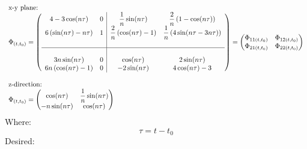 \documentclass[11pt, a4paper]{article}
\begin{document}
\begin{equation}
    \begin{array}{l}
        \text{x-y plane:} \\
        \Phi_{(t,t_0)} = \left(\begin{array}{cc|cc}
            4-3\cos(n\tau) & 0 &\displaystyle \frac{1}{n}\sin(n\tau) &\displaystyle \frac{2}{n}\left(1-\cos(n\tau)\right) \\ 
            6\left(\sin(n\tau)-n\tau\right) & 1 &\displaystyle \frac{2}{n}\left(\cos(n\tau)-1\right) &\displaystyle \frac{1}{n}\left(4\sin(n\tau-3n\tau)\right)\\ &&& \\ \hline &&& \\
            3n\sin(n\tau) & 0 & \cos(n\tau) & 2\sin(n\tau) \\
            6n\left(\cos(n\tau)-1\right) & 0 & -2\sin(n\tau) & 4\cos(n\tau)-3 
        \end{array}\right) = \begin{pmatrix}
            \Phi_{11(t,t_0)} & \Phi_{12(t,t_0)} \\
            \Phi_{21(t,t_0)} & \Phi_{22(t,t_0)}
        \end{pmatrix} \\ \\ 
    \text{z-direction:} \\
    \Phi_{(t,t_0)} = \begin{pmatrix}
        \cos(n\tau) & \displaystyle\frac{1}{n}\sin(n\tau) \\
        -n\sin(n\tau) & \cos(n\tau)
    \end{pmatrix}
    \end{array}
\end{equation}
Where:
\begin{equation*}
    \tau = t-t_0
\end{equation*}
Desired:
\end{document}
